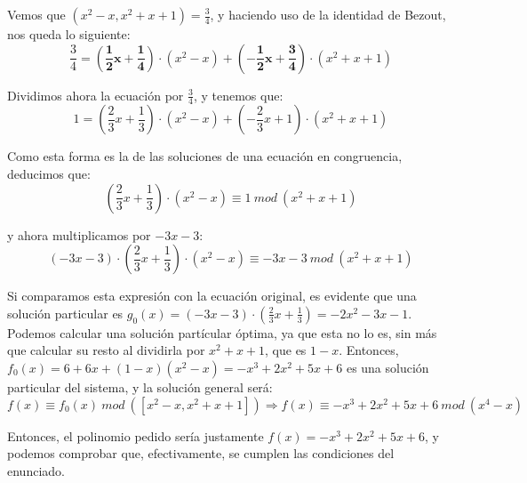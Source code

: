 Vemos que $(x^2-x,x^2+x+1) = \frac{3}{4}$, y haciendo uso de la identidad de Bezout, nos queda lo siguiente: 
$$\frac{3}{4} = \bm{(\frac{1}{2}x + \frac{1}{4})}\cdot (x^2-x) + \bm{(-\frac{1}{2}x + \frac{3}{4})}\cdot (x^2+x+1)$$ 

Dividimos ahora la ecuación por $\frac{3}{4}$, y tenemos que:
$$ 1 = \left(\frac{2}{3}x + \frac{1}{3}\right)\cdot (x^2-x)+ \left(-\frac{2}{3}x + 1\right) \cdot (x^2+x+1)$$

Como esta forma es la de las soluciones de una ecuación en congruencia, deducimos que: 
$$\left(\frac{2}{3}x + \frac{1}{3}\right)\cdot (x^2-x) \equiv 1\ mod\ (x^2+x+1)$$ 

y ahora multiplicamos por $-3x-3$:
$$(-3x-3)\cdot \left(\frac{2}{3}x + \frac{1}{3}\right)\cdot (x^2-x) \equiv -3x-3\ mod\ (x^2+x+1)$$ 

Si comparamos esta expresión con la ecuación original, es evidente que una solución particular es $g_0(x) = (-3x-3)\cdot(\frac{2}{3}x + \frac{1}{3}) = -2x^2 -3x -1$. Podemos calcular una solución partícular óptima, ya que esta no lo es, sin más que calcular su resto al dividirla por $x^2 + x +1$, que es $1-x$. Entonces, $f_0(x) = 6 + 6x + (1-x)(x^2-x) = -x^3 + 2x^2 + 5x + 6$ es una solución particular del sistema, y la solución general será: 
$$f(x) \equiv f_0(x)\ mod\ ([x^2-x,x^2+x+1]) \Rightarrow f(x) \equiv -x^3 + 2x^2 + 5x + 6\ mod\ (x^4 - x)$$

Entonces, el polinomio pedido sería justamente $f(x) = -x^3 + 2x^2 + 5x + 6$, y podemos comprobar que, efectivamente, se cumplen las condiciones del enunciado.